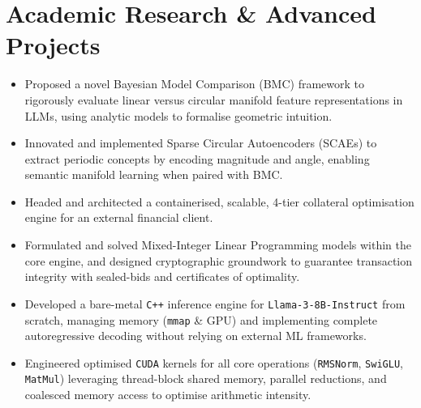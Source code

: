 \documentclass{cv}
\begin{document}
\section{Academic Research \& Advanced Projects}
\begin{subsections}
    \begin{itemize}[leftmargin=!, itemindent=-1em]
        \item Proposed a novel Bayesian Model Comparison (BMC) framework to rigorously evaluate linear versus circular manifold feature representations in LLMs, using analytic models to formalise geometric intuition.
        \item Innovated and implemented Sparse Circular Autoencoders (SCAEs) to extract periodic concepts by encoding magnitude and angle, enabling semantic manifold learning when paired with BMC.
    \end{itemize}

    \begin{itemize}[leftmargin=!, itemindent=-1em]
        \item Headed and architected a containerised, scalable, 4-tier collateral optimisation engine for an external financial client.
        \item Formulated and solved Mixed-Integer Linear Programming models within the core engine, and designed cryptographic groundwork to guarantee transaction integrity with sealed-bids and certificates of optimality.
    \end{itemize}

    \begin{itemize}[leftmargin=!, itemindent=-1em]
        \item Developed a bare-metal \verb|C++| inference engine for \verb|Llama-3-8B-Instruct| from scratch, managing memory (\verb|mmap| \& GPU) and implementing complete autoregressive decoding without relying on external ML frameworks.
        \item Engineered optimised \verb|CUDA| kernels for all core operations (\verb|RMSNorm|, \verb|SwiGLU|, \verb|MatMul|) leveraging thread-block shared memory, parallel reductions, and coalesced memory access to optimise arithmetic intensity.
    \end{itemize}


\end{subsections}
\end{document}
